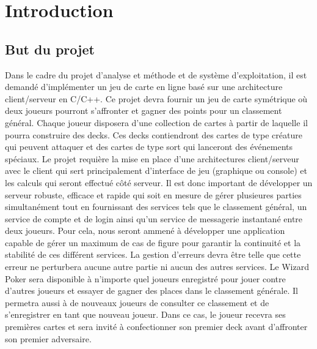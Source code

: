 \documentclass[11pt,a4paper]{article}
\begin{document}
    
    \pagestyle{empty}
\tableofcontents
\newpage
\pagestyle{fancy}

\setcounter{page}{1}

\section{Introduction}
\label{sec:intro}

\subsection{But du projet}
\label{sec:but}

Dans le cadre du projet d'analyse et méthode et de système d'exploitation, il est demandé d'implémenter un jeu de carte en ligne basé sur une architecture client/serveur en C/C++.
\medbreak
Ce projet devra fournir un jeu de carte symétrique où deux joueurs pourront s'affronter et gagner des points pour un classement général. Chaque joueur disposera d'une collection de cartes à partir de laquelle il pourra construire des decks. Ces decks contiendront des cartes de type créature qui peuvent attaquer et des cartes de type sort qui lanceront des événements spéciaux.
\medbreak
Le projet requière la mise en place d'une architectures client/serveur avec le client qui sert principalement d'interface de jeu (graphique ou console) et les calculs qui seront effectué côté serveur. Il est donc important de développer un serveur robuste, efficace et rapide qui soit en mesure de gérer plusieures parties simultanément tout en fournissant des services tels que le classement général, un service de compte et de login ainsi qu'un service de messagerie instantané entre deux joueurs. Pour cela, nous seront ammené à développer une application capable de gérer un maximum de cas de figure pour garantir la continuité et la stabilité de ces différent services. La gestion d'erreurs devra être telle que cette erreur ne perturbera aucune autre partie ni aucun des autres services.
\medbreak
Le Wizard Poker sera disponible à n'importe quel joueurs enregistré pour jouer contre d'autres joueurs et essayer de gagner des places dans le classement générale. Il permetra aussi à de nouveaux joueurs de consulter ce classement et de s'enregistrer en tant que nouveau joueur. Dans ce cas, le joueur recevra ses premières cartes et sera invité à confectionner son premier deck avant d'affronter son premier adversaire.

\end{document}
